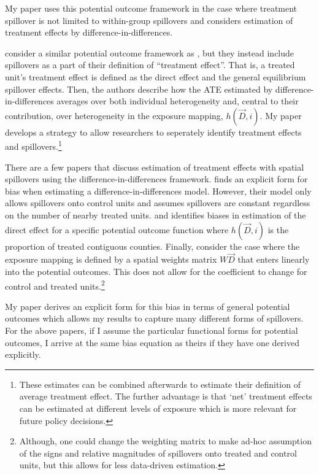 \documentclass[11pt]{article}
\begin{document}
My paper uses this potential outcome framework in the case where treatment spillover is not limited to within-group spillovers and considers estimation of treatment effects by difference-in-differences. 

\citet{Sävje_Aronow_Hudgens_2019} consider a similar potential outcome framework as \citet{Vazquez-Bare_2019}, but they instead include spillovers as a part of their definition of ``treatment effect''. That is, a treated unit's treatment effect is defined as the direct effect and the general equilibrium spillover effects. Then, the authors describe how the ATE estimated by difference-in-differences averages over both individual heterogeneity and, central to their contribution, over heterogeneity in the exposure mapping, $h(\vec{D}, i)$. My paper develops a strategy to allow researchers to seperately identify treatment effects and spillovers.\footnote{These estimates can be combined afterwards to estimate their definition of average treatment effect. The further advantage is that `net' treatment effects can be estimated at different levels of exposure which is more relevant for future policy decisions.}

There are a few papers that discuss estimation of treatment effects with spatial spillovers using the difference-in-differences framework. \citet{Clarke_2017} finds an explicit form for bias when estimating a difference-in-differences model. However, their model only allows spillovers onto control units and assumes spillovers are constant regardless on the number of nearby treated units. \citet{Berg_Streitz_2019} and \citet{Verbitsky-Savitz_Raudenbush_2012} identifies biases in estimation of the direct effect for a specific potential outcome function where $h(\vec{D}, i)$ is the proportion of treated contiguous counties. Finally, \citet{Delgado_Florax_2015} consider the case where the exposure mapping is defined by a spatial weights matrix $W\vec{D}$ that enters linearly into the potential outcomes. This does not allow for the coefficient to change for control and treated units.\footnote{Although, one could change the weighting matrix to make ad-hoc assumption of the signs and relative magnitudes of spillovers onto treated and control units, but this allows for less data-driven estimation.}

My paper derives an explicit form for this bias in terms of general potential outcomes which allows my results to capture many different forms of spillovers. For the above papers, if I assume the particular functional forms for potential outcomes, I arrive at the same bias equation as theirs if they have one derived explicitly. 
\end{document}
